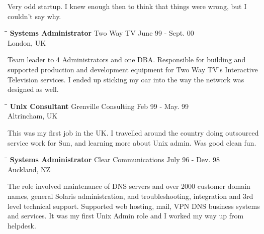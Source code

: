 \documentclass{res}
\begin{document}
\begin{resume}
	Very odd startup.  I knew enough then to think that things were wrong, but I couldn't say why.
	\begin{tabbing}
	   \hspace{2.3in}\= \hspace{2.6in}\= \kill %
	    {\bf Systems Administrator} \>Two Way TV \> June 99 - Sept. 00\\
	                          \>London, UK
	\end{tabbing}\vspace{-20pt}
	Team leader to 4 Administrators and one DBA. Responsible for building and supported production and development equipment for Two Way TV's Interactive Television services.  I ended up sticking my oar into the way the network was designed as well.
	
	\begin{tabbing}
	   \hspace{2.3in}\= \hspace{2.6in}\= \kill %
	    {\bf Unix Consultant} \>Grenville Consulting \> Feb 99 - May. 99\\
	                          \>Altrincham, UK
	\end{tabbing}\vspace{-20pt}
	
	This was my first job in the UK.  I travelled around the country doing outsourced service work for Sun, and learning more about Unix admin.  Was good clean fun.
	  
	\begin{tabbing}
	   \hspace{2.3in}\= \hspace{2.6in}\= \kill %
	    {\bf Systems Administrator} \>Clear Communications \> July 96 - Dev. 98\\
	                          \>Auckland, NZ
		\end{tabbing}\vspace{-20pt}
	 The role involved maintenance of DNS servers and over 2000 customer domain names, general Solaris administration, and troubleshooting, integration and 3rd level technical support. Supported web hosting, mail, VPN DNS business systems and services. It was my first Unix Admin role and I worked my way up from helpdesk.
	

\end{resume}
\end{document}
